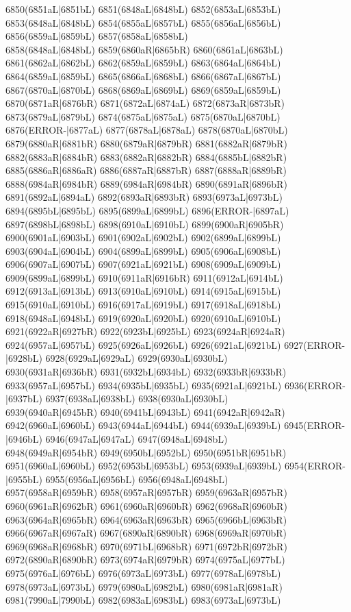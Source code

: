 6850(6851aL|6851bL) 6851(6848aL|6848bL) 6852(6853aL|6853bL) 6853(6848aL|6848bL) 6854(6855aL|6857bL) 6855(6856aL|6856bL) 6856(6859aL|6859bL) 6857(6858aL|6858bL) \\6858(6848aL|6848bL) 6859(6860aR|6865bR) 6860(6861aL|6863bL) 6861(6862aL|6862bL) 6862(6859aL|6859bL) 6863(6864aL|6864bL) 6864(6859aL|6859bL) 6865(6866aL|6868bL) 6866(6867aL|6867bL) \\6867(6870aL|6870bL) 6868(6869aL|6869bL) 6869(6859aL|6859bL) 6870(6871aR|6876bR) 6871(6872aL|6874aL) 6872(6873aR|6873bR) 6873(6879aL|6879bL) 6874(6875aL|6875aL) 6875(6870aL|6870bL) \\6876(ERROR-|6877aL) 6877(6878aL|6878aL) 6878(6870aL|6870bL) 6879(6880aR|6881bR) 6880(6879aR|6879bR) 6881(6882aR|6879bR) 6882(6883aR|6884bR) 6883(6882aR|6882bR) 6884(6885bL|6882bR) \\6885(6886aR|6886aR) 6886(6887aR|6887bR) 6887(6888aR|6889bR) 6888(6984aR|6984bR) 6889(6984aR|6984bR) 6890(6891aR|6896bR) 6891(6892aL|6894aL) 6892(6893aR|6893bR) 6893(6973aL|6973bL) \\6894(6895bL|6895bL) 6895(6899aL|6899bL) 6896(ERROR-|6897aL) 6897(6898bL|6898bL) 6898(6910aL|6910bL) 6899(6900aR|6905bR) 6900(6901aL|6903bL) 6901(6902aL|6902bL) 6902(6899aL|6899bL) \\6903(6904aL|6904bL) 6904(6899aL|6899bL) 6905(6906aL|6908bL) 6906(6907aL|6907bL) 6907(6921aL|6921bL) 6908(6909aL|6909bL) 6909(6899aL|6899bL) 6910(6911aR|6916bR) 6911(6912aL|6914bL) \\6912(6913aL|6913bL) 6913(6910aL|6910bL) 6914(6915aL|6915bL) 6915(6910aL|6910bL) 6916(6917aL|6919bL) 6917(6918aL|6918bL) 6918(6948aL|6948bL) 6919(6920aL|6920bL) 6920(6910aL|6910bL) \\6921(6922aR|6927bR) 6922(6923bL|6925bL) 6923(6924aR|6924aR) 6924(6957aL|6957bL) 6925(6926aL|6926bL) 6926(6921aL|6921bL) 6927(ERROR-|6928bL) 6928(6929aL|6929aL) 6929(6930aL|6930bL) \\6930(6931aR|6936bR) 6931(6932bL|6934bL) 6932(6933bR|6933bR) 6933(6957aL|6957bL) 6934(6935bL|6935bL) 6935(6921aL|6921bL) 6936(ERROR-|6937bL) 6937(6938aL|6938bL) 6938(6930aL|6930bL) \\6939(6940aR|6945bR) 6940(6941bL|6943bL) 6941(6942aR|6942aR) 6942(6960aL|6960bL) 6943(6944aL|6944bL) 6944(6939aL|6939bL) 6945(ERROR-|6946bL) 6946(6947aL|6947aL) 6947(6948aL|6948bL) \\6948(6949aR|6954bR) 6949(6950bL|6952bL) 6950(6951bR|6951bR) 6951(6960aL|6960bL) 6952(6953bL|6953bL) 6953(6939aL|6939bL) 6954(ERROR-|6955bL) 6955(6956aL|6956bL) 6956(6948aL|6948bL) \\6957(6958aR|6959bR) 6958(6957aR|6957bR) 6959(6963aR|6957bR) 6960(6961aR|6962bR) 6961(6960aR|6960bR) 6962(6968aR|6960bR) 6963(6964aR|6965bR) 6964(6963aR|6963bR) 6965(6966bL|6963bR) \\6966(6967aR|6967aR) 6967(6890aR|6890bR) 6968(6969aR|6970bR) 6969(6968aR|6968bR) 6970(6971bL|6968bR) 6971(6972bR|6972bR) 6972(6890aR|6890bR) 6973(6974aR|6979bR) 6974(6975aL|6977bL) \\6975(6976aL|6976bL) 6976(6973aL|6973bL) 6977(6978aL|6978bL) 6978(6973aL|6973bL) 6979(6980aL|6982bL) 6980(6981aR|6981aR) 6981(7990aL|7990bL) 6982(6983aL|6983bL) 6983(6973aL|6973bL) 
